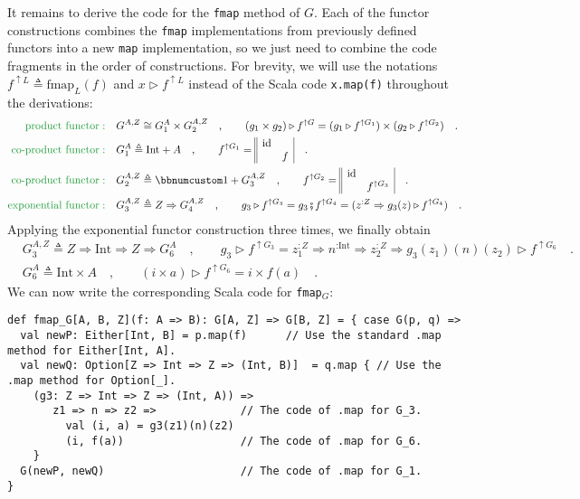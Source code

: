 It remains to derive the code for the \lstinline!fmap! method of
$G$. Each of the functor constructions combines the \lstinline!fmap!
implementations from previously defined functors into a new \lstinline!map!
implementation, so we just need to combine the code fragments in the
order of constructions. For brevity, we will use the notations $f^{\uparrow L}\triangleq\text{fmap}_{L}(f)$
and $x\triangleright f^{\uparrow L}$ instead of the Scala code \lstinline!x.map(f)!
throughout the derivations:
\begin{align*}
{\color{greenunder}\text{product functor}:}\quad & G^{A,Z}\cong G_{1}^{A}\times G_{2}^{A,Z}\quad,\quad\quad(g_{1}\times g_{2})\triangleright f^{\uparrow G}=(g_{1}\triangleright f^{\uparrow G_{1}})\times(g_{2}\triangleright f^{\uparrow G_{2}})\quad.\\
{\color{greenunder}\text{co-product functor}:}\quad & G_{1}^{A}\triangleq\text{Int}+A\quad,\quad\quad f^{\uparrow G_{1}}=\begin{array}{||cc|}
\text{id} & \\
 & f
\end{array}\quad.\\
{\color{greenunder}\text{co-product functor}:}\quad & G_{2}^{A,Z}\triangleq\bbnum 1+G_{3}^{A,Z}\quad,\quad\quad f^{\uparrow G_{2}}=\begin{array}{||cc|}
\text{id} & \\
 & f^{\uparrow G_{3}}
\end{array}\quad.\\
{\color{greenunder}\text{exponential functor}:}\quad & G_{3}^{A,Z}\triangleq Z\Rightarrow G_{4}^{A,Z}\quad,\quad\quad g_{3}\triangleright f^{\uparrow G_{3}}=g_{3}\bef f^{\uparrow G_{4}}=(z^{:Z}\Rightarrow g_{3}(z)\triangleright f^{\uparrow G_{4}})\quad.
\end{align*}
Applying the exponential functor construction three times, we finally
obtain
\begin{align*}
 & G_{3}^{A,Z}\triangleq Z\Rightarrow\text{Int}\Rightarrow Z\Rightarrow G_{6}^{A}\quad,\quad\quad g_{3}\triangleright f^{\uparrow G_{3}}=z_{1}^{:Z}\Rightarrow n^{:\text{Int}}\Rightarrow z_{2}^{:Z}\Rightarrow g_{3}(z_{1})(n)(z_{2})\triangleright f^{\uparrow G_{6}}\quad.\\
 & G_{6}^{A}\triangleq\text{Int}\times A\quad,\quad\quad(i\times a)\triangleright f^{\uparrow G_{6}}=i\times f(a)\quad.
\end{align*}
We can now write the corresponding Scala code for \lstinline!fmap!$_{G}$:
\begin{lstlisting}
def fmap_G[A, B, Z](f: A => B): G[A, Z] => G[B, Z] = { case G(p, q) =>
  val newP: Either[Int, B] = p.map(f)      // Use the standard .map method for Either[Int, A].
  val newQ: Option[Z => Int => Z => (Int, B)]  = q.map { // Use the .map method for Option[_].
    (g3: Z => Int => Z => (Int, A)) => 
       z1 => n => z2 =>             // The code of .map for G_3.
         val (i, a) = g3(z1)(n)(z2)
         (i, f(a))                  // The code of .map for G_6.
    }
  G(newP, newQ)                     // The code of .map for G_1.
}
\end{lstlisting}


